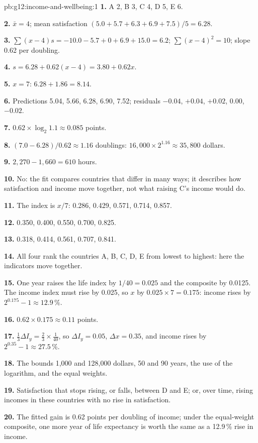 \begin{solution}{pb:g12:income-and-wellbeing:1}
\textbf{1.} A 2, B 3, C 4, D 5, E 6.

\textbf{2.} $\bar x = 4$; mean satisfaction $(5.0 + 5.7 + 6.3 + 6.9 + 7.5)/5 = 6.28$.

\textbf{3.} $\sum (x - 4) s = -10.0 - 5.7 + 0 + 6.9 + 15.0 = 6.2$; $\sum (x - 4)^2 = 10$; slope 0.62 per doubling.

\textbf{4.} $s = 6.28 + 0.62 (x - 4) = 3.80 + 0.62 x$.

\textbf{5.} $x = 7$: $6.28 + 1.86 = 8.14$.

\textbf{6.} Predictions 5.04, 5.66, 6.28, 6.90, 7.52; residuals $-0.04$, $+0.04$, $+0.02$, $0.00$, $-0.02$.

\textbf{7.} $0.62 \times \log_2 1.1 \approx 0.085$ points.

\textbf{8.} $(7.0 - 6.28)/0.62 \approx 1.16$ doublings: $16{,}000 \times 2^{1.16} \approx 35{,}800$ dollars.

\textbf{9.} $2{,}270 - 1{,}660 = 610$ hours.

\textbf{10.} No: the fit compares countries that differ in many ways; it describes how satisfaction and income move together, not what raising C's income would do.

\textbf{11.} The index is $x/7$: 0.286, 0.429, 0.571, 0.714, 0.857.

\textbf{12.} 0.350, 0.400, 0.550, 0.700, 0.825.

\textbf{13.} 0.318, 0.414, 0.561, 0.707, 0.841.

\textbf{14.} All four rank the countries A, B, C, D, E from lowest to highest: here the indicators move together.

\textbf{15.} One year raises the life index by $1/40 = 0.025$ and the composite by 0.0125. The income index must rise by 0.025, so $x$ by $0.025 \times 7 = 0.175$: income
rises by $2^{0.175} - 1 \approx 12.9\,\%$.

\textbf{16.} $0.62 \times 0.175 \approx 0.11$ points.

\textbf{17.} $\tfrac13 \Delta I_y = \tfrac23 \times \tfrac1{40}$, so $\Delta I_y = 0.05$, $\Delta x = 0.35$, and income rises by $2^{0.35} - 1 \approx 27.5\,\%$.

\textbf{18.} The bounds 1,000 and 128,000 dollars, 50 and 90 years, the use of the logarithm, and the equal weights.

\textbf{19.} Satisfaction that stops rising, or falls, between D and E; or, over time, rising incomes in these countries with no rise in satisfaction.

\textbf{20.} The fitted gain is 0.62 points per doubling of income; under the equal-weight composite, one more year of life expectancy is worth the same as a 12.9\,\% rise in
income.
\end{solution}
